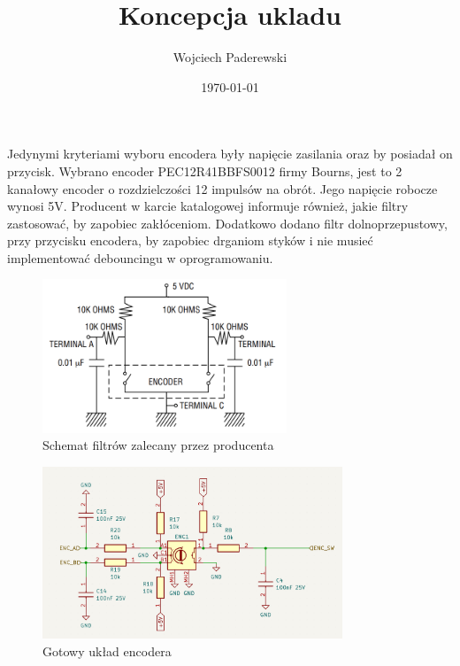 \documentclass[../../main.tex]{subfiles}
\author{Wojciech Paderewski}
\date{\today}
\title{Koncepcja ukladu}
\begin{document}
Jedynymi kryteriami wyboru encodera były napięcie zasilania oraz by posiadał on przycisk.
Wybrano encoder PEC12R\-41BBF\-S0012 firmy Bourns, jest to 2 kanałowy encoder o rozdzielczości 12 impulsów na obrót. 
Jego napięcie robocze wynosi 5V. Producent w karcie katalogowej informuje również, jakie filtry zastosować, by zapobiec zakłóceniom.
Dodatkowo dodano filtr dolnoprzepustowy, przy przycisku encodera, by zapobiec drganiom  styków i nie musieć implementować debouncingu w oprogramowaniu.

\begin{figure}[H]
    \centering
    \includegraphics[width=0.65\textwidth]{encoder_karta.png}
    \caption{Schemat filtrów zalecany przez producenta}
\end{figure}

\begin{figure}[H]
    \centering
    \includegraphics[width=0.8\textwidth]{encoder.png}
    \caption{Gotowy układ encodera}
\end{figure}
\end{document}
